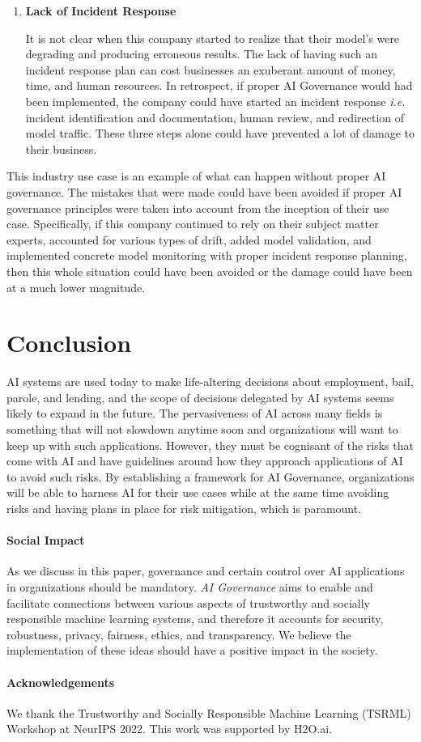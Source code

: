 \documentclass{article}
\begin{document}
\begin{enumerate}
\item \textbf {Lack of Incident Response}

\smallskip It is not clear when this company started to realize that their model's were degrading and producing erroneous results. 
The lack of having such an incident response plan can cost businesses an exuberant amount of money, time, and human resources. 
In retrospect, if proper AI Governance would had been implemented, the company could have started an incident response \emph{i.e.} incident identification and documentation, human review, and redirection of model traffic. 
These three steps alone could have prevented a lot of damage to their business. 

\end{enumerate}

This industry use case is an example of what can happen without proper AI governance. The mistakes that were made could have been avoided if proper AI governance principles were taken into account from the inception of their use case. Specifically, if this company continued to rely on their subject matter experts, accounted for various types of drift, added model validation, and implemented concrete model monitoring with proper incident response planning, then this whole situation could have been avoided or the damage could have been at a much lower magnitude. 


\section{Conclusion}
AI systems are used today to make life-altering decisions about employment, bail, parole, and lending, and the scope of decisions delegated by AI systems seems likely to expand in the future. The pervasiveness of AI across many fields is something that will not slowdown anytime soon and organizations will want to keep up with such applications. However, they must be cognisant of the risks that come with AI and have guidelines around how they approach applications of AI to avoid such risks. By establishing a framework for AI Governance, organizations will be able to harness AI for their use cases while at the same time avoiding risks and having plans in place for risk mitigation, which is paramount.

\paragraph{Social Impact}

As we discuss in this paper, governance and certain control over AI applications in organizations should be mandatory. \emph{AI Governance} aims to enable and facilitate connections between various aspects of trustworthy and socially responsible machine learning systems, and therefore it accounts for security, robustness, privacy, fairness, ethics, and transparency. We believe the implementation of these ideas should have a positive impact in the society. 

\paragraph{Acknowledgements}
We thank the Trustworthy and Socially Responsible Machine Learning (TSRML) Workshop at NeurIPS 2022. This work was supported by H2O.ai.

{\small


}
\end{document}
